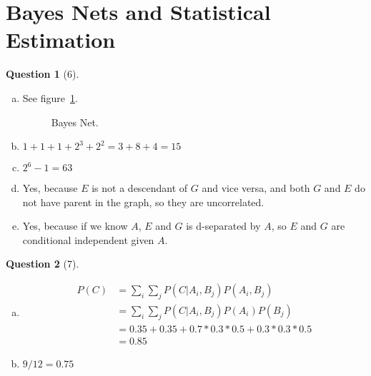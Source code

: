 \documentclass{article}
\theoremstyle{quest}
\newtheorem*{question}{Question}
\begin{document}
\section*{Bayes Nets and Statistical Estimation}
\begin{question}[6]
\end{question}
\begin{enumerate}[a.]
\item
See figure~\ref{f5}.
\begin{figure}[h!]
\centering
{}
\caption{Bayes Net.} \label{f5}
\end{figure}
\item
$1+1+1+2^3+2^2=3+8+4=15$
\item
$2^6-1=63$
\item
Yes, because $E$ is not a descendant of $G$ and vice versa, and both $G$ and $E$ do not have parent in the graph, so they are uncorrelated.
\item
Yes, because if we know $A$, $E$ and $G$ is d-separated by $A$, so $E$ and $G$ are conditional independent given $A$.
\end{enumerate}
\begin{question}[7]
\end{question}
\begin{enumerate}[a.]
\item
\begin{align*} 
P(C) & =\sum\limits_{i}\sum\limits_{j}P(C| A_i, B_j)P(A_i, B_j) \\ 
& = \sum\limits_{i}\sum\limits_{j}P(C| A_i, B_j)P(A_i)P(B_j)\\
& = 0.35+0.35+0.7*0.3*0.5+0.3*0.3*0.5 \\
& = 0.85
\end{align*}
\item
$9/12=0.75$
\end{enumerate}
\end{document}
